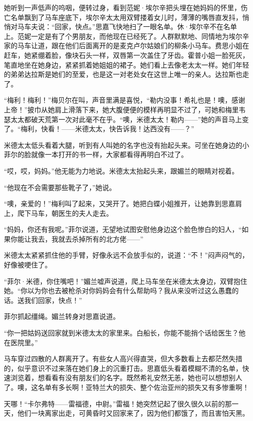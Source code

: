 \par 她听到一声低声的呜咽，便转过身，看到范妮·埃尔辛把头埋在她妈妈的怀里，伤亡名单飘到了马车座底下，埃尔辛太太用双臂搂着女儿时，薄薄的嘴唇直发抖，悄悄对马车夫说：“回家，快点。”思嘉飞快地扫了一眼名单。休·埃尔辛不在名单上。范妮一定是有了个男朋友，而他现在已经死了。人群默默地、同情地为埃尔辛家的马车让道，跟在他们后面离开的是麦克卢尔姑娘们的柳条小马车。费思小姐在赶车，她紧绷着脸，像块石头一样，双唇第一次盖住了牙齿。霍普小姐一脸死灰，笔直地坐在她身边，紧紧抓着她姐姐的裙子。她们看上去像老太太一样。她们年轻的弟弟达拉斯是她们的至爱，也是这一对老处女在这世上唯一的亲人。达拉斯也走了。
\par “梅利！梅利！”梅贝尔在叫，声音里满是喜悦，“勒内没事！希礼也是！噢，感谢上帝！”披巾从她肩上滑落下来，她大腹便便的模样再明显不过了，可她和梅里韦瑟太太都破天荒第一次对此毫不在乎。“噢，米德太太！勒内——”她的声音马上变了。“梅利，快看！——米德太太，快告诉我！达西没有——？”
\par 米德太太低头看着大腿，听到有人叫她的名字也没有抬起头来。可坐在她身边的小菲尔的脸就像一本打开的书一样，大家都看得再明白不过了。
\par “哎，哎，妈妈。”他无能为力地说。米德太太抬起头来，跟媚兰的眼睛对视着。
\par “他现在不会需要那些靴子了，”她说。
\par “噢，亲爱的！”梅利叫了起来，又哭开了。她把白蝶小姐推开，让她靠到思嘉肩上，爬下马车，朝医生的夫人走去。
\par “妈妈，你还有我呢。”菲尔说道，无望地试图安慰他身边这个脸色惨白的妇人，“如果你能让我去，我就去杀掉所有的北方佬——”
\par 米德太太紧紧抓住他的手臂，好像永远不会放手似的，说道：“不！”闷声闷气的，好像被哽住了。
\par “菲尔·米德，你住嘴吧！”媚兰嘘声说道，爬上马车坐在米德太太身边，双臂抱住她。“你以为你也去被枪杀对你妈妈会有什么帮助吗？我从来没听过这么愚蠢的话。送我们回家，快点！”
\par 菲尔抓起缰绳。媚兰转身对思嘉说道。
\par “你一把姑妈送回家就到米德太太的家里来。白船长，你能不能捎个话给医生？他在医院里。”
\par 马车穿过四散的人群离开了。有些女人高兴得直哭，但大多数看上去都茫然失措的，似乎意识不过来落在她们身上的沉重打击。思嘉低头看着模糊不清的名单，快速浏览着，想看看有没有朋友们的名字。既然希礼安然无恙，她也可以想想别人了。噢，这名单有多长啊！亚特兰大的损失、整个佐治亚州的损失又有多惨重啊！
\par 天哪！“卡尔弗特——雷福德，中尉。”雷福！她突然记起了很久很久以前的那一天，他们一块离家出走，可黄昏时又回家来了，因为他们都饿了，而且害怕天黑。
